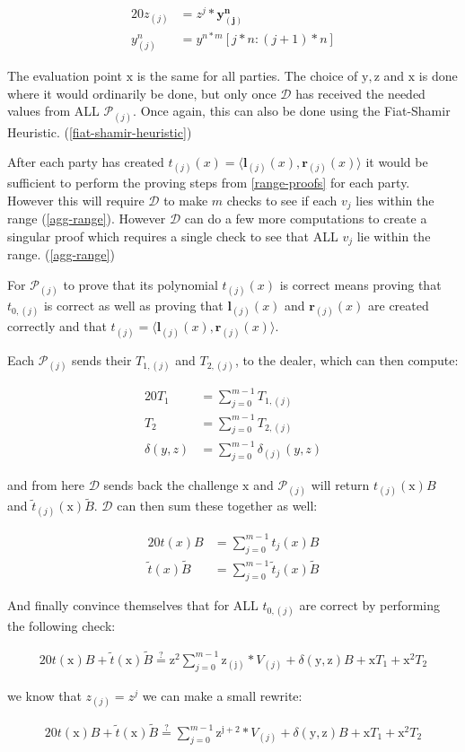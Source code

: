 \documentclass{article}
\newcommand{\eq}[1]{\begin{alignat*}{20}#1\end{alignat*}}
\renewcommand{\vec}[1]{\boldsymbol{#1}}
\newcommand{\ran}[1]{\mathrm{#1}}
\renewcommand{\P}{\mathcal{P}}
\newcommand{\D}{\mathcal{D}}
\newcommand{\dotp}[2]{\langle #1, #2 \rangle}
\newcommand{\tB}{\widetilde{B}}
\renewcommand{\tt}{\widetilde{t}}
\begin{document}
\eq{
	z_{(j)} &= z^j * \vec{y^n_{(j)}}\\
	y^n_{(j)} &= y^{n*m}[j*n:(j+1)*n]
}

The evaluation point $\ran{x}$ is the same for all parties. The choice
of $\ran{y}, \ran{z}$ and $\ran{x}$ is done where it would ordinarily
be done, but only once $\D$ has received the needed values from
ALL $\P_{(j)}$. Once again, this can also be done using the Fiat-Shamir
Heuristic. (\ref{fiat-shamir-heuristic})

After each party has created $t_{(j)}(x) =
\dotp{\vec{l}_{(j)}(x)}{\vec{r}_{(j)}(x)}$ it would be sufficient
to perform the proving steps from \ref{range-proofs} for each
party. However this will require $\D$ to make $m$ checks to see
if each $v_j$ lies within the range (\ref{agg-range}). However $\D$ can do a few
more computations to create a singular proof which requires a single
check to see that ALL $v_j$ lie within the range. (\ref{agg-range})

For $\P_{(j)}$ to prove that its polynomial $t_{(j)}(x)$
is correct means proving that $t_{0,(j)}$ is correct as well as proving that $\vec{l}_{(j)}(x)$ and
$\vec{r}_{(j)}(x)$ are created correctly and that $t_{(j)} =
\dotp{\vec{l}_{(j)}(x)}{\vec{r}_{(j)}(x)}$.

Each $\P_{(j)}$ sends their $T_{1,(j)}$ and $T_{2,(j)}$, to the dealer,
which can then compute:

\eq{
	T_1 &= \sum^{m-1}_{j = 0} T_{1,(j)}\\
	T_2 &= \sum^{m-1}_{j = 0} T_{2,(j)}\\
	\delta(y,z) &= \sum^{m-1}_{j = 0} \delta_{(j)}(y,z)
}

and from here $\D$ sends back the challenge
$\ran{x}$ and $\P_{(j)}$ will return $t_{(j)}(\ran{x})B$ and
$\tt_{(j)}(\ran{x})\tB$. $\D$ can then sum these
together as well:

\eq{
t(x)B &= \sum^{m-1}_{j = 0} t_{j}(x)B\\
\tt(x)\tB &= \sum^{m-1}_{j = 0} \tt_{j}(x)\tB
}

And finally convince themselves that for ALL $t_{0,(j)}$ are correct
by performing the following check:

\eq{
	t(\ran{x})B + \widetilde{t}(\ran{x})\widetilde{B} \stackrel{?}{=} \ran{z^2}\sum^{m-1}_{j = 0} \ran{z_{(j)}}*V_{(j)} + \delta(\ran{y},\ran{z})B + \ran{x}T_1 + \ran{x^2}T_2
}

we know that $z_{(j)} = z^j$ we can make a small rewrite:

\eq{
	t(\ran{x})B + \widetilde{t}(\ran{x})\widetilde{B} \stackrel{?}{=} \sum^{m-1}_{j = 0} \ran{z^{j+2}}*V_{(j)} + \delta(\ran{y},\ran{z})B + \ran{x}T_1 + \ran{x^2}T_2
}
\end{document}
